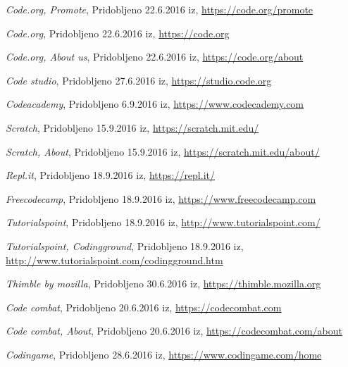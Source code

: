 \begin{thebibliography}{100}
 \emph{Code.org, Promote}, Pridobljeno
  22.6.2016 iz, \url{https://code.org/promote}

 \emph{Code.org}, Pridobljeno
  22.6.2016 iz, \url{https://code.org}

 \emph{Code.org, About us}, Pridobljeno
  22.6.2016 iz, \url{https://code.org/about}

 \emph{Code studio}, Pridobljeno
  27.6.2016 iz, \url{https://studio.code.org}

 \emph{Codeacademy}, Pridobljeno 6.9.2016 iz,
  \url{https://www.codecademy.com}

 \emph{Scratch}, Pridobljeno 15.9.2016 iz,
  \url{https://scratch.mit.edu/}

 \emph{Scratch, About}, Pridobljeno 15.9.2016 iz,
  \url{https://scratch.mit.edu/about/}

 \emph{Repl.it}, Pridobljeno 18.9.2016 iz,
  \url{https://repl.it/}

 \emph{Freecodecamp}, Pridobljeno 18.9.2016 iz,
  \url{https://www.freecodecamp.com}

 \emph{Tutorialspoint}, Pridobljeno 18.9.2016 iz,
  \url{http://www.tutorialspoint.com/}

 \emph{Tutorialspoint,
    Codingground}, Pridobljeno 18.9.2016 iz,
  \url{http://www.tutorialspoint.com/codingground.htm}

 \emph{Thimble by mozilla}, Pridobljeno
  30.6.2016 iz, \url{https://thimble.mozilla.org}

 \emph{Code combat}, Pridobljeno 20.6.2016 iz,
  \url{https://codecombat.com}

 \emph{Code combat, About}, Pridobljeno
  20.6.2016 iz, \url{https://codecombat.com/about}

 \emph{Codingame}, Pridobljeno 28.6.2016 iz,
  \url{https://www.codingame.com/home}

\end{thebibliography}


